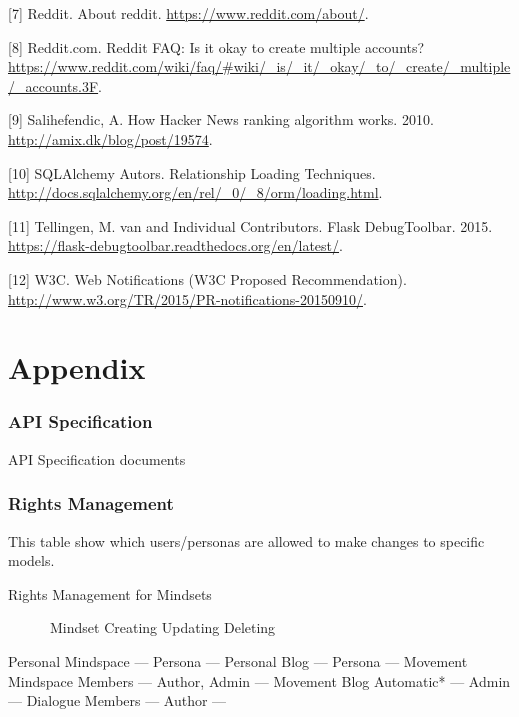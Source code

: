 {[}7{]} Reddit. About reddit. \url{https://www.reddit.com/about/}.

{[}8{]} Reddit.com. Reddit FAQ: Is it okay to create multiple accounts?
\url{https://www.reddit.com/wiki/faq/\#wiki/_is/_it/_okay/_to/_create/_multiple/_accounts.3F}.

{[}9{]} Salihefendic, A. How Hacker News ranking algorithm works. 2010.
\url{http://amix.dk/blog/post/19574}.

{[}10{]} SQLAlchemy Autors. Relationship Loading Techniques.
\url{http://docs.sqlalchemy.org/en/rel/_0/_8/orm/loading.html}.

{[}11{]} Tellingen, M. van and Individual Contributors. Flask
DebugToolbar. 2015.
\url{https://flask-debugtoolbar.readthedocs.org/en/latest/}.

{[}12{]} W3C. Web Notifications (W3C Proposed Recommendation).
\url{http://www.w3.org/TR/2015/PR-notifications-20150910/}.

\appendix

\part*{Appendix}

\section{API Specification}\label{api-specification}

API Specification documents

\section{Rights Management}\label{rights-management}

This table show which users/personas are allowed to make changes to
specific models.

Rights Management for Mindsets

~~~~~~Mindset \textbar{} Creating \textbar{} Updating \textbar{}
Deleting

Personal Mindspace --- Persona --- Personal Blog --- Persona ---
Movement Mindspace Members --- Author, Admin --- Movement Blog
Automatic* --- Admin --- Dialogue Members --- Author ---

